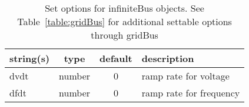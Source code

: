\begin{table}[ht]
\centering
\begin{tabular}{p{5cm} c c p{7cm}}
\hline
string(s) & type & default & description \\
\hline
dvdt & number & 0 & ramp rate for voltage\\
dfdt & number & 0 & ramp rate for frequency\\
\hline
\end{tabular}
\caption{Set options for infiniteBus objects. See Table~\ref{table:gridBus} for additional settable options through gridBus}
\label{table:infiniteBus}
\end{table}

